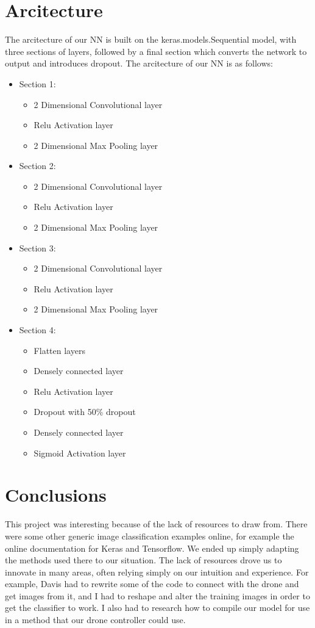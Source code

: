 \documentclass[12pt]{article}
\begin{document}
\section{Arcitecture}
{

	\quad The arcitecture of our NN is built on the keras.models.Sequential model, with three sections of layers, followed by a final section which converts the network to output and introduces dropout. The arcitecture of our NN is as follows: 

	\begin{itemize}
		\item{Section 1:}
		\begin{itemize}
			\item{2 Dimensional Convolutional layer} 
			\item{Relu Activation layer}
			\item{2 Dimensional Max Pooling layer}
		\end{itemize}
		\item{Section 2:}
		\begin{itemize}
			\item{2 Dimensional Convolutional layer} 
			\item{Relu Activation layer}
			\item{2 Dimensional Max Pooling layer}
		\end{itemize}
		\item{Section 3:}
		\begin{itemize}
			\item{2 Dimensional Convolutional layer} 
			\item{Relu Activation layer}
			\item{2 Dimensional Max Pooling layer}
		\end{itemize}
		\item{Section 4:}
		\begin{itemize}
			\item{Flatten layers}
			\item{Densely connected layer}
			\item{Relu Activation layer}
			\item{Dropout with 50\% dropout}
			\item{Densely connected layer}
			\item{Sigmoid Activation layer}
		\end{itemize}
	\end{itemize}
}

\section{Conclusions}
{
	This project was interesting because of the lack of resources to draw from.
	There were some other generic image classification examples online, for example the online documentation for Keras and Tensorflow. 
	We ended up simply adapting the methods used there to our situation. 
	The lack of resources drove us to innovate in many areas, often relying simply on our intuition and experience. 
	For example, Davis had to rewrite some of the code to connect with the drone and get images from it, and I had to reshape and alter the training images in order to get the classifier to work. I also had to research how to compile our model for use in a method that our drone controller could use.
}
\end{document}
